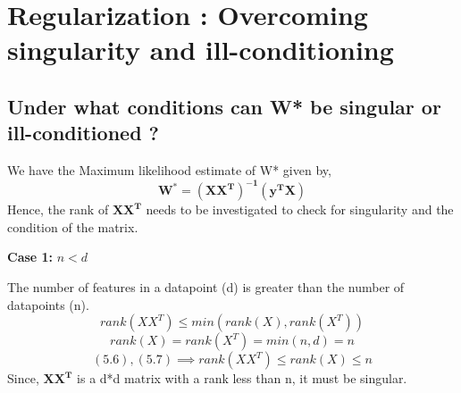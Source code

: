 \documentclass[11pt]{article}
\begin{document}

\section{Regularization : Overcoming singularity and ill-conditioning }

\subsection{Under what conditions can W* be singular or ill-conditioned ?}
We have the Maximum likelihood estimate of W* given by, 
$${\mathbf{W^* = (X X^T)^{-1}(y^T X)}}$$
Hence, the rank of ${\mathbf{X X^T}}$ needs to be investigated to check for singularity and the condition of the matrix.

\textbf{Case 1:} ${n < d}$

The number of features in a datapoint (d) is greater than the number of datapoints (n).
\begin{equation}
    rank(X X^T) \leq min(rank(X), rank(X^T))
\end{equation}
\begin{equation}
    rank(X) = rank(X^T) = min(n,d) = n 
\end{equation}
\begin{equation}
    (5.6), (5.7) \implies rank(X X^T) \leq rank(X) \leq n 
\end{equation}
Since, ${\mathbf{X X^T}}$ is a d*d matrix with a rank less than n, it must be singular.
\end{document}

